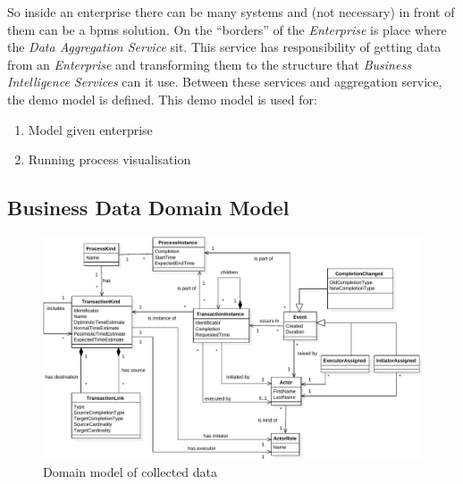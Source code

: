 So inside an enterprise there can be many systems and (not necessary) in front of them can be a \gls{bpms} solution. On the ``borders'' of the \textit{Enterprise} is place where the \textit{Data Aggregation Service} sit. This service has responsibility of getting data from an \textit{Enterprise} and transforming them to the structure that \textit{Business Intelligence Services} can it use. Between these services and aggregation service, the \gls{demo} model is defined. This \gls{demo} model is used for:


\begin{enumerate}
\item Model given enterprise
\item Running process visualisation
\end{enumerate}

\subsection{Business Data Domain Model}
\begin{figure}[ht!]
  \centering
  \includegraphics[width=14cm,keepaspectratio]{img/domain-data-model}
  \caption{Domain model of collected data}
  \label{fig:domain-data-model}
\end{figure}    

